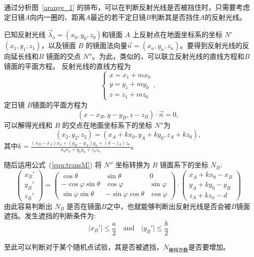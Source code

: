 \documentclass[../main.tex]{subfiles}
\begin{document}
\begin{itemize}
通过分析图~\ref{arange_1} 的排布，可以在判断反射光线是否被挡住时，只需要考虑定日镜\(A\)向内一圈的、距离\(A\)最近的若干定日镜\(B\)判断其是否挡住\(A\)的反射光线。

已知反射光线 \(\vec \lambda _{o} = (x_0,y_0,z_0)\)和镜面 \(A\) 上反射点在地面坐标系的坐标 \(N'\)\((x_1, y_1, z_1)\)，以及镜面 \(B\) 的镜面法向量\(\vec n = (x_{n} , y_{n} ,z_{n})\)。要得到反射光线的反向延长线和\(B\) 镜面的交点 \(N''\)。为此，类似的，可以联立反射光线的直线方程和\(B\)镜面的平面方程。
反射光线的直线方程为
\[
\begin{cases}
x = x_1 + m x_0\\
y = y_1 + m y_0\\
z = z_1 + m z_0
\end{cases},
\]
定日镜 \(B\)镜面的平面方程为
\[
(x - x_{B} , y - y_{B} , z-z_{B}) \cdot \vec n = 0,
\]
可以解得光线和 \(B\) 的交点在地面坐标系下的坐标 \(N''\)为
\[
(x_2 , y_2, z_2) = (x_{A} + k x_0, y_{A} + ky_{0} , z_{A} + kz_{0}),
\]
其中\(k = \displaystyle \frac{(x_{B} - x_{A}) x_{n} + (y_{B} - y_{A}) y_{n} + (d- z_{A}) z_{n}}{x_0 x_{n} + y_{0} y_{n} + z_{0} z _{n}}\)。

随后运用公式~(\ref{equ:transM}) 将 \(N''\) 坐标转换为 \(B\) 镜面系下的坐标 \(N_{B}\):
\[
\begin{pmatrix}
x_{B} '\\
y_{B} '\\
z _{B} '
\end{pmatrix}
=
\begin{pmatrix}
\cos \theta & \sin \theta & 0\\
-\cos \varphi \sin \theta & \cos \varphi & \sin \varphi \\
\sin \varphi \sin \theta & - \sin \varphi \cos \theta & \cos \varphi
\end{pmatrix}
\cdot
\begin{pmatrix}
x_{A} + kx_0 - x_{B}\\
y_{A} + ky_{0} - y_{B}\\
z_{A} + kz_{n} - d
\end{pmatrix}
\]
由此容易判断出 \(N_{B}\) 是否在镜面\(B\)之中，也就能够判断出反射光线是否会被\(B\)镜面遮挡。发生遮挡的判断条件为:
\begin{equation}
\vert x_{B}' \vert \le \frac{a}{2}\quad \text{and} \quad \vert y_{B}' \vert \le \frac{b}{2}
\end{equation}
\end{itemize}

至此可以判断对于某个随机点试验，其是否被遮挡，\(N_{\text{被挡次数}}\)是否要增加。
\end{document}

